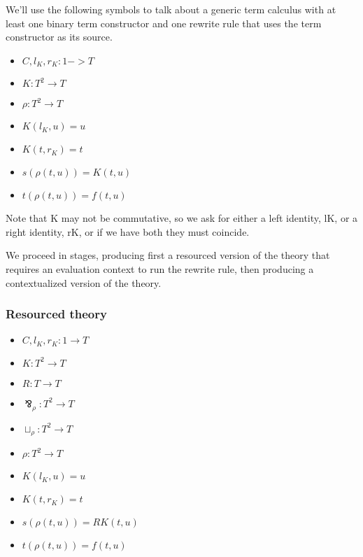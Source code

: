 \documentclass{llncs}
\renewcommand{\:}{\colon}
\begin{document}
We'll use the following symbols to talk about a generic term calculus
with at least one binary term constructor and one rewrite rule that
uses the term constructor as its source.

\begin{itemize}
  \item $C, l_{K}, r_{K} : 1 -> T$
  \item $K : T^{2} \rightarrow T$
  \item $\rho : T^{2} \rightarrow T$             %
  \item $K(l_{K}, u) = u$
  \item $K(t, r_{K}) = t$
  \item $s(\rho(t,u)) = K(t, u)$
  \item $t(\rho(t,u)) = f(t,u)$
\end{itemize}

Note that K may not be commutative, so we ask for either a left
identity, lK, or a right identity, rK, or if we have both they must
coincide.

We proceed in stages, producing first a resourced version of the
theory that requires an evaluation context to run the rewrite rule,
then producing a contextualized version of the theory.

\subsubsection{Resourced theory}
\begin{itemize}
  \item $C, l_{K}, r_{K} : 1 \rightarrow T$
  \item $K : T^{2} \rightarrow T$
  \item $R : T \rightarrow T$
  \item $\bindnasrepma_{\rho} : T^{2} \rightarrow T$
  \item $\sqcup_{\rho} : T^{2} \rightarrow T$
  \item $\rho : T^{2} \rightarrow T$             %
  \item $K(l_{K}, u) = u$
  \item $K(t, r_{K}) = t$
  \item $s(\rho(t,u)) = RK(t, u)$
  \item $t(\rho(t,u)) = f(t,u)$                    %
\end{itemize}
\end{document}
